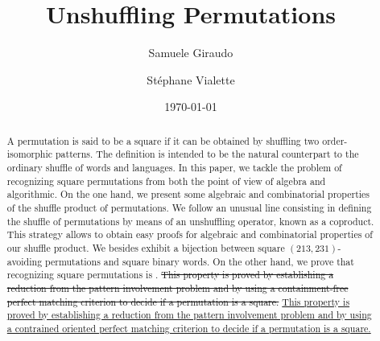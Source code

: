\documentclass[a4paper]{llncs}
\begin{document}

\title{%
Unshuffling Permutations}%

\author{%
  Samuele Giraudo \and
  St\'ephane Vialette
}%
\date{\today}

\maketitle


\begin{abstract}
    A permutation is said to be a square if it can be obtained by
    shuffling two order-isomorphic patterns. The definition is intended
    to be the natural counterpart to the ordinary shuffle of words and
    languages. In this paper, we tackle the problem of recognizing square
    permutations from both the point of view of algebra and algorithmic.
    On the one hand, we present some algebraic and combinatorial
    properties of the shuffle product of permutations. We follow an
    unusual line consisting in defining the shuffle of permutations by
    means of an unshuffling operator, known as a coproduct. This
    strategy allows to obtain easy proofs for algebraic and combinatorial
    properties of our shuffle product. We besides exhibit a bijection
    between square $(213,231)$-avoiding permutations and square binary
    words. On the other hand, we prove that recognizing square
    permutations is \NPC. \sout{This property is proved by establishing a
    reduction from the pattern involvement problem and by using a
    containment-free perfect matching criterion to decide if a
    permutation is a square.}
    \uline{This property is proved by establishing a
    reduction from the pattern involvement problem and by using a
    contrained oriented perfect matching criterion to decide if a
    permutation is a square.}
\end{abstract}


\end{document}
